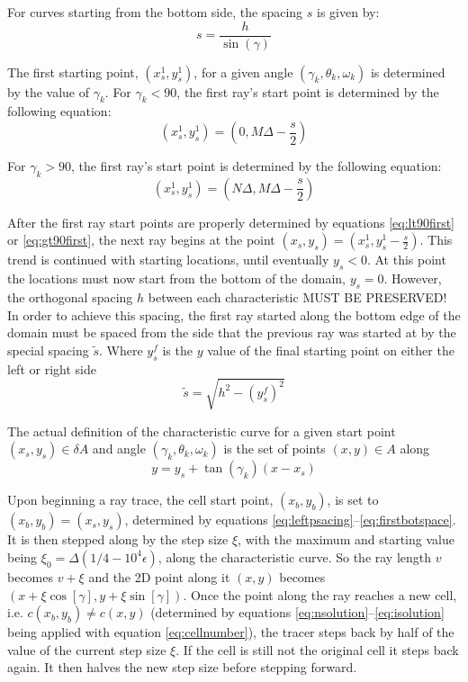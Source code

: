 \documentclass{article}
\begin{document}
For curves starting from the bottom side, the spacing $s$ is given by:
\begin{equation}
s=\frac{h}{\sin({\gamma})}
\label{eq:botspacing}
\end{equation}

The first starting point, $(x_s^1,y_s^1)$, for a given angle $(\gamma_k,\theta_k,\omega_k)$ is determined by the value of $\gamma_k$. 
For $\gamma_k<90$, the first ray's start point is determined by the following equation:
\begin{equation}
(x_s^1,y_s^1)=(0,M\Delta -\frac{s}{2})
\label{eq:lt90first}
\end{equation}

For $\gamma_k>90$, the first ray's start point is determined by the following equation:
\begin{equation}
(x_s^1,y_s^1)=(N\Delta,M\Delta -\frac{s}{2})
\label{eq:gt90first}
\end{equation}

After the first ray start points are properly determined by equations \ref{eq:lt90first} or \ref{eq:gt90first}, the next ray begins at the point $(x_s,y_s) = (x_s^1,y_s^1-\frac{s}{2})$. 
This trend is continued with starting locations, until eventually $y_s<0$.
At this point the locations must now start from the bottom of the domain, $y_s=0$. 
However, the orthogonal spacing $h$ between each characteristic MUST BE PRESERVED!
In order to achieve this spacing, the first ray started along the bottom edge of the domain must be spaced from the side that the previous ray was started at by the special spacing $\tilde{s}$.
Where $y_s^f$ is the $y$ value of the final starting point on either the left or right side
\begin{equation}
\tilde{s}=\sqrt{h^2-(y_s^f)^2}
\label{eq:firstbotspace}
\end{equation}

The actual definition of the characteristic curve for a given start point $(x_s,y_s)\in \delta A$ and angle $(\gamma_k,\theta_k,\omega_k)$ is the set of points $(x,y)\in A$ along 
\begin{equation}
y=y_s+\tan{(\gamma_k)}(x-x_s)
\label{eq:curvedef}
\end{equation}

Upon beginning a ray trace, the cell start point, $(x_b,y_b)$, is set to $(x_b,y_b)=(x_s,y_s)$, determined by equations \ref{eq:leftpsacing}--\ref{eq:firstbotspace}. 
It is then stepped along by the step size $\xi$, with the maximum and starting value being $\xi_0=\Delta(1/4-10^4\epsilon)$, along the characteristic curve.
So the ray length $v$ becomes $v+\xi$ and the 2D point along it $(x,y)$ becomes $(x+\xi \cos{\left[\gamma\right]},y+\xi \sin{\left[\gamma\right]})$. 
Once the point along the ray reaches a new cell, i.e. $c(x_b,y_b)\ne c(x,y)$ (determined by equations \ref{eq:nsolution}--\ref{eq:isolution} being applied with equation \ref{eq:cellnumber}), the tracer steps back by half of the value of the current step size $\xi$. 
If the cell is still not the original cell it steps back again. 
It then halves the new step size before stepping forward. 
\end{document}
